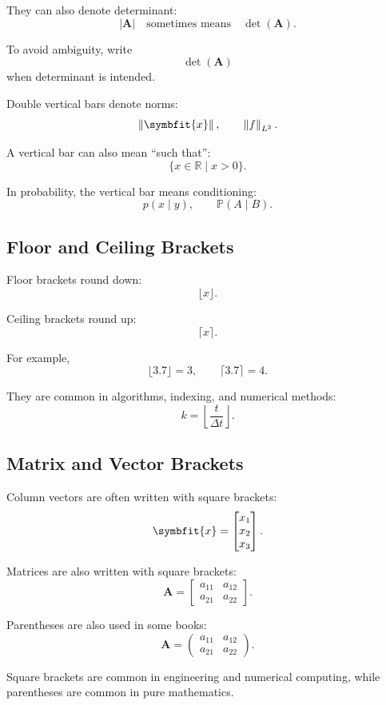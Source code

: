 \documentclass[11pt,twocolumn]{article}
\newcommand{\R}{\mathbb{R}}
\newcommand{\vct}[1]{\symbfit{#1}}   %
\newcommand{\mat}[1]{\symbf{#1}}     %
\newcommand{\determinant}{\operatorname{det}}
\newcommand{\norm}[1]{\left\lVert #1 \right\rVert}
\newcommand{\abs}[1]{\left\lvert #1 \right\rvert}
\newcommand{\Prob}{\mathbb{P}}
\begin{document}
They can also denote determinant:
\[
\abs{\mat{A}}
\quad
\text{sometimes means}
\quad
\determinant(\mat{A}).
\]

To avoid ambiguity, write
\[
\determinant(\mat{A})
\]
when determinant is intended.

Double vertical bars denote norms:
\[
\norm{\vct{x}},
\qquad
\norm{f}_{L^2}.
\]

A vertical bar can also mean ``such that'':
\[
\{x\in\R \mid x>0\}.
\]

In probability, the vertical bar means conditioning:
\[
p(x\mid y),
\qquad
\Prob(A\mid B).
\]

\subsection{Floor and Ceiling Brackets}

Floor brackets round down:
\[
\lfloor x\rfloor.
\]

Ceiling brackets round up:
\[
\lceil x\rceil.
\]

For example,
\[
\lfloor 3.7\rfloor = 3,
\qquad
\lceil 3.7\rceil = 4.
\]

They are common in algorithms, indexing, and numerical methods:
\[
k = \left\lfloor \frac{t}{\Delta t} \right\rfloor.
\]

\subsection{Matrix and Vector Brackets}

Column vectors are often written with square brackets:
\[
\vct{x}
=
\begin{bmatrix}
x_1\\
x_2\\
x_3
\end{bmatrix}.
\]

Matrices are also written with square brackets:
\[
\mat{A}
=
\begin{bmatrix}
a_{11} & a_{12}\\
a_{21} & a_{22}
\end{bmatrix}.
\]

Parentheses are also used in some books:
\[
\mat{A}
=
\begin{pmatrix}
a_{11} & a_{12}\\
a_{21} & a_{22}
\end{pmatrix}.
\]

Square brackets are common in engineering and numerical computing, while
parentheses are common in pure mathematics.
\end{document}
